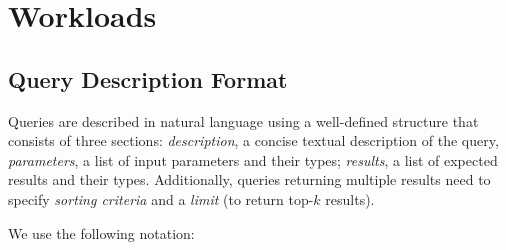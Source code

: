 \chapter{Workloads}
\label{sec:workloads}


\section{Query Description Format}
\label{sub:queries_structure}
Queries are described in natural language using a well-defined structure that consists of three sections:
\textit{description}, a concise textual description of the query,
\textit{parameters}, a list of input parameters and their types;
\textit{results}, a list of expected results and their types.
Additionally, queries returning multiple results need to specify \emph{sorting criteria} and a \emph{limit} (to return top-$k$ results).

We use the following notation:

